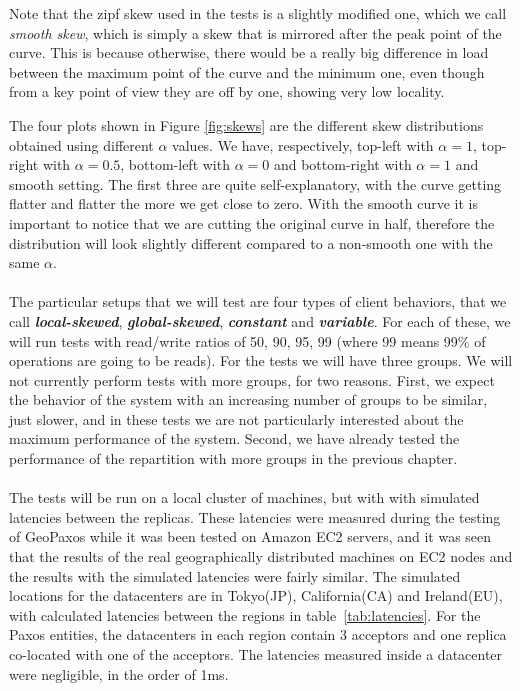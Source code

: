 Note that the zipf\citep{zipf} skew used in the tests is a slightly modified one, which we call \emph{smooth skew}, which is simply a skew that is mirrored after the peak point of the curve. This is because otherwise, there would be a really big difference in load between the maximum point of the curve and the minimum one, even though from a key point of view they are off by one, showing very low locality.

The four plots shown in Figure \ref{fig:skews} are the different skew distributions obtained using different $\alpha$ values. We have, respectively, top-left with $\alpha = 1$, top-right with $\alpha = 0.5$, bottom-left with $\alpha = 0$ and bottom-right with $\alpha = 1$ and smooth setting. The first three are quite self-explanatory, with the curve getting flatter and flatter the more we get close to zero. With the smooth curve it is important to notice that we are cutting the original curve in half, therefore the distribution will look slightly different compared to a non-smooth one with the same $\alpha$.
\\\\
The particular setups that we will test are four types of client behaviors, that we call \textbf{\emph{local-skewed}}, \textbf{\emph{global-skewed}}, \textbf{\emph{constant}} and \textbf{\emph{variable}}. For each of these, we will run tests with read/write ratios of 50, 90, 95, 99 (where 99 means 99\% of operations are going to be reads). For the tests we will have three groups. We will not currently perform tests with more groups, for two reasons. First, we expect the behavior of the system with an increasing number of groups to be similar, just slower, and in these tests we are not particularly interested about the maximum performance of the system. Second, we have already tested the performance of the repartition with more groups in the previous chapter.
\\\\
The tests will be run on a local cluster of machines, but with with simulated latencies between the replicas. These latencies were measured during the testing of GeoPaxos\citep{geopaxos} while it was been tested on Amazon EC2 servers, and it was seen that the results of the real geographically distributed machines on EC2 nodes and the results with the simulated latencies were fairly similar. The simulated locations for the datacenters are in Tokyo(JP), California(CA) and Ireland(EU), with calculated latencies between the regions in table~\ref{tab:latencies}. For the Paxos entities, the datacenters in each region contain 3 acceptors and one replica co-located with one of the acceptors. The latencies measured inside a datacenter were negligible, in the order of 1ms.


